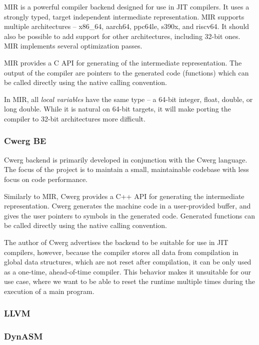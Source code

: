 MIR is a powerful compiler backend designed for use in JIT compilers\cite{mir}. It uses a strongly typed, target independent intermediate representation. MIR supports multiple architectures -- x86\_64, aarch64, ppc64le, s390x, and riscv64. It should also be possible to add support for other architectures, including 32-bit ones. MIR implements several optimization passes.

MIR provides a C API for generating of the intermediate representation. The output of the compiler are pointers to the generated code (functions) which can be called directly using the native calling convention.

In MIR, all \textit{local variables} have the same type -- a 64-bit integer, float, double, or long double. While it is natural on 64-bit targets, it will make porting the compiler to 32-bit architectures more difficult.


\subsubsection{Cwerg BE}

Cwerg backend is primarily developed in conjunction with the Cwerg language\cite{cwerg}. The focus of the project is to maintain a small, maintainable codebase with less focus on code performance.

Similarly to MIR, Cwerg provides a C++ API for generating the intermediate representation. Cwerg generates the machine code in a user-provided buffer, and gives the user pointers to symbols in the generated code. Generated functions can be called directly using the native calling convention.

The author of Cwerg advertises the backend to be suitable for use in JIT compilers, however, because the compiler stores all data from compilation in global data structures, which are not reset after compilation, it can be only used as a one-time, ahead-of-time compiler. This behavior makes it unsuitable for our use case, where we want to be able to reset the runtime multiple times during the execution of a main program.


\subsubsection{LLVM}



\subsubsection{DynASM}

